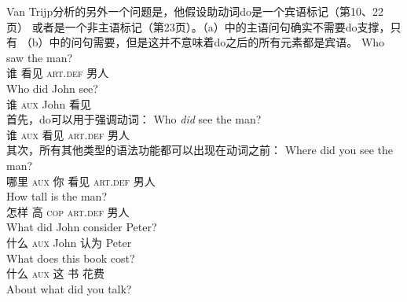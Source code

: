 Van Trijp分析的另外一个问题是，他假设助动词do是一个宾语标记（第10、22页） 或者是一个非主语标记（第23页）。（a）中的主语问句确实不需要do支撑，只有 （b）中的问句需要，但是这并不意味着do之后的所有元素都是宾语。
\eal
\ex 
\gll Who saw the man?\\  
     谁 看见 \textsc{art}.\textsc{def} 男人\\
\ex 
\gll Who did John see?\\  
     谁 \textsc{aux} John 看见\\
\zl
首先，do可以用于强调动词：
\ea
\gll Who \emph{did} see the man?\\  
     谁 \textsc{aux} 看见 \textsc{art}.\textsc{def} 男人\\
\z
其次，所有其他类型的语法功能都可以出现在动词之前：
\eal
\settowidth{}
\ex
\gll Where did you see the man?\\    
     哪里 \textsc{aux} 你 看见 \textsc{art}.\textsc{def} 男人\\
\ex 
\gll How tall is the man?\\     
     怎样 高 \textsc{cop} \textsc{art}.\textsc{def} 男人\\
\ex
\gll What did John consider Peter?\\     
     什么 \textsc{aux} John 认为 Peter\\ 
\ex 
\gll What does this book cost?\\
     什么 \textsc{aux} 这 书 花费\\       
\ex 
\gll About what did you talk?\\       
